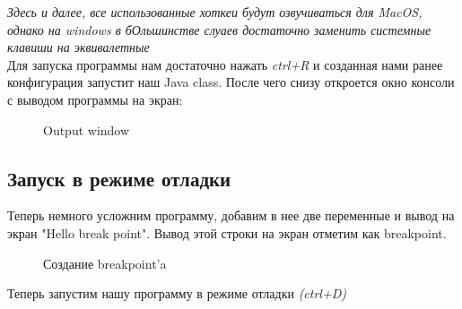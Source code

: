 \documentclass[12pt, a4paper]{article}
\begin{document}
    \textit{Здесь и далее, все использованные хоткеи будут озвучиваться для MacOS,
    однако на windows в бОльшинстве слуаев достаточно заменить системные клавиши на эквивалетные}\\
    
    Для запуска программы нам достаточно нажать \textit{ctrl+R} и созданная нами ранее конфигурация запустит наш Java class.
    После чего снизу откроется окно консоли с выводом программы на экран:

    \begin{figure}[H]
        \caption{Output window}
    \end{figure}

    \subsection{Запуск в режиме отладки}

    Теперь немного усложним программу, добавим в нее две переменные и вывод на экран "Hello break point".
    Вывод этой строки на экран отметим как breakpoint.
    
    \begin{figure}[H]
        \caption{Создание breakpoint'a}
    \end{figure}

    Теперь запустим нашу программу в режиме отладки \textit{(ctrl+D)}
    
\end{document}
